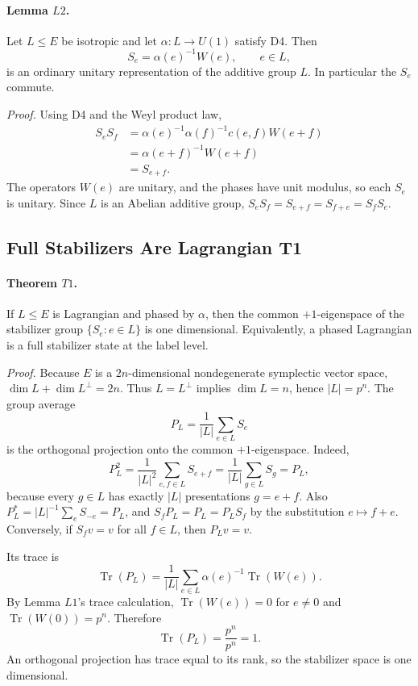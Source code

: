 \paragraph{Lemma \(L2\).}
Let \(L\leq E\) be isotropic and let \(\alpha:L\to U(1)\) satisfy D4.  Then
\[
  S_e=\alpha(e)^{-1}W(e),\qquad e\in L,
\]
is an ordinary unitary representation of the additive group \(L\).  In
particular the \(S_e\) commute.

\emph{Proof.}
Using D4 and the Weyl product law,
\[
\begin{aligned}
  S_eS_f
  &=\alpha(e)^{-1}\alpha(f)^{-1}c(e,f)W(e+f)\\
  &=\alpha(e+f)^{-1}W(e+f)\\
  &=S_{e+f}.
\end{aligned}
\]
The operators \(W(e)\) are unitary, and the phases have unit modulus, so each
\(S_e\) is unitary.  Since \(L\) is an Abelian additive group,
\(S_eS_f=S_{e+f}=S_{f+e}=S_fS_e\).

\subsection{Full Stabilizers Are Lagrangian T1}

\paragraph{Theorem \(T1\).}
If \(L\leq E\) is Lagrangian and phased by \(\alpha\), then the common
\(+1\)-eigenspace of the stabilizer group \(\{S_e:e\in L\}\) is one
dimensional.  Equivalently, a phased Lagrangian is a full stabilizer state at
the label level.

\emph{Proof.}
Because \(E\) is a \(2n\)-dimensional nondegenerate symplectic vector space,
\(\dim L+\dim L^\perp=2n\).  Thus \(L=L^\perp\) implies \(\dim L=n\), hence
\(|L|=p^n\).  The group average
\[
  P_L=\frac1{|L|}\sum_{e\in L}S_e
\]
is the orthogonal projection onto the common \(+1\)-eigenspace.  Indeed,
\[
  P_L^2=\frac1{|L|^2}\sum_{e,f\in L}S_{e+f}
  =
  \frac1{|L|}\sum_{g\in L}S_g=P_L,
\]
because every \(g\in L\) has exactly \(|L|\) presentations \(g=e+f\).
Also \(P_L^*=|L|^{-1}\sum_eS_{-e}=P_L\), and
\(S_fP_L=P_L=P_LS_f\) by the substitution \(e\mapsto f+e\).  Conversely, if
\(S_fv=v\) for all \(f\in L\), then \(P_Lv=v\).

Its trace is
\[
  \operatorname{Tr}(P_L)
  =
  \frac1{|L|}\sum_{e\in L}\alpha(e)^{-1}\operatorname{Tr}(W(e)).
\]
By Lemma \(L1\)'s trace calculation, \(\operatorname{Tr}(W(e))=0\) for
\(e\ne0\) and \(\operatorname{Tr}(W(0))=p^n\).  Therefore
\[
  \operatorname{Tr}(P_L)=\frac{p^n}{p^n}=1.
\]
An orthogonal projection has trace equal to its rank, so the stabilizer space
is one dimensional.

